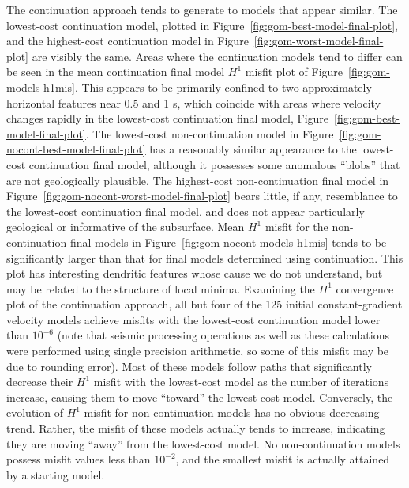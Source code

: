 The continuation approach tends to generate to models that appear similar.  The lowest-cost continuation model, plotted in Figure~\ref{fig:gom-best-model-final-plot}, and the highest-cost continuation model in Figure~\ref{fig:gom-worst-model-final-plot} are visibly the same.  Areas where the continuation models tend to differ can be seen in the mean continuation final model $H^1$ misfit plot of Figure~\ref{fig:gom-models-h1mis}.  This appears to be primarily confined to two approximately horizontal features near 0.5 and 1 s, which coincide with areas where velocity changes rapidly in the lowest-cost continuation final model, Figure~\ref{fig:gom-best-model-final-plot}.   The lowest-cost non-continuation model in Figure~\ref{fig:gom-nocont-best-model-final-plot} has a reasonably similar appearance to the lowest-cost continuation final model, although it possesses some anomalous ``blobs'' that are not geologically plausible. The highest-cost non-continuation final model in Figure~\ref{fig:gom-nocont-worst-model-final-plot} bears little, if any, resemblance to the lowest-cost continuation final model, and does not appear particularly geological or informative of the subsurface.  Mean $H^1$ misfit for the non-continuation final models in Figure~\ref{fig:gom-nocont-models-h1mis} tends to be significantly larger than that for final models determined using continuation.  This plot has interesting dendritic features whose cause we do not understand, but may be related to the structure of local minima. Examining the $H^1$ convergence plot of the continuation approach, all but four of the 125 initial constant-gradient velocity models achieve misfits with the lowest-cost continuation model lower than $10^{-6}$ (note that seismic processing operations as well as these calculations were performed using single precision arithmetic, so some of this misfit may be due to rounding error).  Most of these models follow paths that significantly decrease their $H^1$ misfit with the lowest-cost model as the number of iterations increase, causing them to move ``toward'' the lowest-cost model.  Conversely, the evolution of $H^1$ misfit for non-continuation models has no obvious decreasing trend. Rather, the misfit of these models actually tends to increase, indicating they are moving ``away'' from the lowest-cost model.  No non-continuation models possess misfit values less than $10^{-2}$, and the smallest misfit is actually attained by a starting model.

